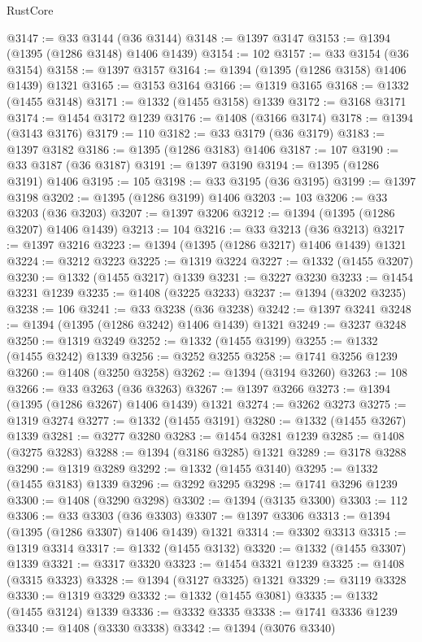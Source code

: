\begin{lexlean}{RustCore}
\begin{coremodule}
@3147 := @33 @3144 (@36 @3144)
@3148 := @1397 @3147
@3153 := @1394 (@1395 (@1286 @3148) @1406 @1439)
@3154 := 102
@3157 := @33 @3154 (@36 @3154)
@3158 := @1397 @3157
@3164 := @1394 (@1395 (@1286 @3158) @1406 @1439) @1321
@3165 := @3153 @3164
@3166 := @1319 @3165
@3168 := @1332 (@1455 @3148)
@3171 := @1332 (@1455 @3158) @1339
@3172 := @3168 @3171
@3174 := @1454 @3172 @1239
@3176 := @1408 (@3166 @3174)
@3178 := @1394 (@3143 @3176)
@3179 := 110
@3182 := @33 @3179 (@36 @3179)
@3183 := @1397 @3182
@3186 := @1395 (@1286 @3183) @1406
@3187 := 107
@3190 := @33 @3187 (@36 @3187)
@3191 := @1397 @3190
@3194 := @1395 (@1286 @3191) @1406
@3195 := 105
@3198 := @33 @3195 (@36 @3195)
@3199 := @1397 @3198
@3202 := @1395 (@1286 @3199) @1406
@3203 := 103
@3206 := @33 @3203 (@36 @3203)
@3207 := @1397 @3206
@3212 := @1394 (@1395 (@1286 @3207) @1406 @1439)
@3213 := 104
@3216 := @33 @3213 (@36 @3213)
@3217 := @1397 @3216
@3223 := @1394 (@1395 (@1286 @3217) @1406 @1439) @1321
@3224 := @3212 @3223
@3225 := @1319 @3224
@3227 := @1332 (@1455 @3207)
@3230 := @1332 (@1455 @3217) @1339
@3231 := @3227 @3230
@3233 := @1454 @3231 @1239
@3235 := @1408 (@3225 @3233)
@3237 := @1394 (@3202 @3235)
@3238 := 106
@3241 := @33 @3238 (@36 @3238)
@3242 := @1397 @3241
@3248 := @1394 (@1395 (@1286 @3242) @1406 @1439) @1321
@3249 := @3237 @3248
@3250 := @1319 @3249
@3252 := @1332 (@1455 @3199)
@3255 := @1332 (@1455 @3242) @1339
@3256 := @3252 @3255
@3258 := @1741 @3256 @1239
@3260 := @1408 (@3250 @3258)
@3262 := @1394 (@3194 @3260)
@3263 := 108
@3266 := @33 @3263 (@36 @3263)
@3267 := @1397 @3266
@3273 := @1394 (@1395 (@1286 @3267) @1406 @1439) @1321
@3274 := @3262 @3273
@3275 := @1319 @3274
@3277 := @1332 (@1455 @3191)
@3280 := @1332 (@1455 @3267) @1339
@3281 := @3277 @3280
@3283 := @1454 @3281 @1239
@3285 := @1408 (@3275 @3283)
@3288 := @1394 (@3186 @3285) @1321
@3289 := @3178 @3288
@3290 := @1319 @3289
@3292 := @1332 (@1455 @3140)
@3295 := @1332 (@1455 @3183) @1339
@3296 := @3292 @3295
@3298 := @1741 @3296 @1239
@3300 := @1408 (@3290 @3298)
@3302 := @1394 (@3135 @3300)
@3303 := 112
@3306 := @33 @3303 (@36 @3303)
@3307 := @1397 @3306
@3313 := @1394 (@1395 (@1286 @3307) @1406 @1439) @1321
@3314 := @3302 @3313
@3315 := @1319 @3314
@3317 := @1332 (@1455 @3132)
@3320 := @1332 (@1455 @3307) @1339
@3321 := @3317 @3320
@3323 := @1454 @3321 @1239
@3325 := @1408 (@3315 @3323)
@3328 := @1394 (@3127 @3325) @1321
@3329 := @3119 @3328
@3330 := @1319 @3329
@3332 := @1332 (@1455 @3081)
@3335 := @1332 (@1455 @3124) @1339
@3336 := @3332 @3335
@3338 := @1741 @3336 @1239
@3340 := @1408 (@3330 @3338)
@3342 := @1394 (@3076 @3340)

\end{coremodule}
\end{lexlean}
